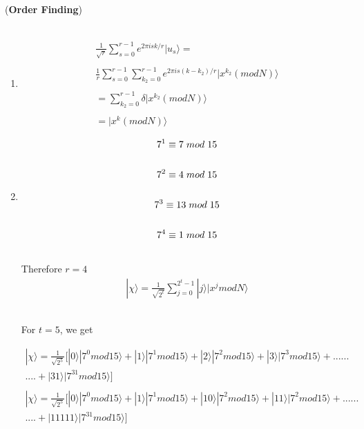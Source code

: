 \documentclass[a4paper,12pt]{article}
\begin{document}
 \begin{large}(\textbf{Order Finding}) \\~\\
 \end{large}
    \begin{enumerate}[label=(\alph*)]

    \item 
    \begin{gather*}
        \frac{1}{\sqrt{r}} \sum_{s=0}^{r-1} e^{2\pi isk/r}|u_s\rangle = \\~\\
        \frac{1}{r}\sum_{s=0}^{r-1} \sum_{k_2=0}^{r-1} e^{2\pi is(k-k_2)/r} |x^{k_2}(mod N)\rangle\\~\\
        = \sum_{k_2=0}^{r-1} \delta |x^{k_2}(mod N)\rangle\\~\\
        = |x^{k}(mod N)\rangle
    \end{gather*}
\item \begin{gather*}
    7^1 \equiv 7 \hspace{0.1cm} mod \hspace{0.1cm} 15 \\~\\
    7^2 \equiv 4 \hspace{0.1cm} mod \hspace{0.1cm} 15 \\~\\
    7^3 \equiv 13 \hspace{0.1cm} mod \hspace{0.1cm} 15 \\~\\
    7^4 \equiv 1 \hspace{0.1cm} mod \hspace{0.1cm} 15 \\~\\
    \end{gather*}
    Therefore $r = 4$
    \begin{gather*}
    |\chi\rangle = \frac{1}{\sqrt{2^t}}\sum_{j=0}^{2^t - 1 }|j\rangle |x^j mod N\rangle\\~\\
    \end{gather*} \\
    For $t=5$, we get

    \begin{gather*}
    |\chi\rangle = \frac{1}{\sqrt{2^5}}[|0\rangle |7^0 mod 15\rangle + |1\rangle |7^1 mod 15\rangle + |2\rangle |7^2 mod 15\rangle + |3\rangle |7^3 mod 15\rangle + ......\\....+|31\rangle |7^{31} mod 15\rangle ]  \\~\\
    |\chi\rangle = \frac{1}{\sqrt{2^5}}[|0\rangle |7^0 mod 15\rangle + |1\rangle |7^1 mod 15\rangle + |10\rangle |7^2 mod 15\rangle + |11\rangle |7^2 mod 15\rangle + ......\\....+|11111\rangle |7^{31} mod 15\rangle ]
    \end{gather*}


\end{enumerate}
\end{document}
